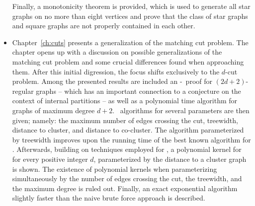 \begin{itemize}
    Finally, a monotonicity theorem is provided, which is used to generate all star graphs on no more than eight vertices and prove that the class of star graphs and square graphs are not properly contained in each other.
    \item Chapter~\ref{ch:cuts} presents a generalization of the matching cut problem.
    The chapter opens up with a discussion on possible generalizations of the matching cut problem and some crucial differences found when approaching them.
    After this initial digression, the focus shifts exclusively to the $d$-cut problem.
    Among the presented results are included an \NP-\Hness\ proof for $(2d+2)$-regular graphs -- which has an important connection to a conjecture on the context of internal partitions -- as well as a polynomial time algorithm for graphs of maximum degree $d + 2$.
    \FPT\ algorithms for several parameters are then given; namely: the maximum number of edges crossing the cut, treewidth, distance to cluster, and distance to co-cluster.
    The algorithm parameterized by treewidth improves upon the running time of the best known algorithm for .
    Afterwards, building on techniques employed for , a polynomial kernel for  for every positive integer $d$, parameterized by the distance to a cluster graph is shown.
    The existence of polynomial kernels when parameterizing simultaneously by the number of edges crossing the cut, the treewidth, and the maximum degree is ruled out.
    Finally, an exact exponential algorithm slightly faster than the naive brute force approach is described.
\end{itemize}

